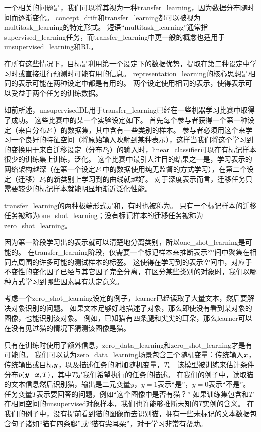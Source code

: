 
一个相关的问题是，我们可以将其视为一种\gls{transfer_learning}，因为数据分布随时间而逐渐变化。
\gls{concept_drift}和\gls{transfer_learning}都可以被视为\gls{multitask_learning}的特定形式。
短语``\gls{multitask_learning}''通常指\gls{supervised_learning}任务，而\gls{transfer_learning}中更一般的概念也适用于\gls{unsupervised_learning}和\gls{RL}。

在所有这些情况下，目标是利用第一个设定下的数据优势，提取在第二种设定中学习时或直接进行预测时可能有用的信息。
\gls{representation_learning}的核心思想是相同的表示可能在两种设定中都是有用的。
两个设定使用相同的表示，使得表示可以受益于两个任务的训练数据。


如前所述，\gls{unsupervised}\gls{DL}用于\gls{transfer_learning}已经在一些机器学习比赛中取得了成功\citep{UTLC+LISA-2011-small,goodfellow+all-NIPS2011}。
这些比赛中的某一个实验设定如下。
首先每个参与者获得一个第一种设定（来自分布$P_1$）的数据集，其中含有一些类别的样本。
参与者必须用这个来学习一个良好的特征空间（将原始输入映射到某种表示），这样当我们将这个学习到的变换用于来自迁移设定（分布$P_2$）的输入时，\gls{linear_classifier}可以在有标记样本很少的训练集上训练，泛化。
这个比赛中最引人注目的结果之一是，学习表示的网络架构越深（在第一个设定$P_1$中的数据使用纯无监督的方式学习），在第二个设定（迁移）$P_2$的新类别上学习到的曲线就越好。
对于深度表示而言，迁移任务只需要较少的标记样本就能明显地渐近泛化性能。


\gls{transfer_learning}的两种极端形式是和，有时也被称为。
只有一个标记样本的迁移任务被称为\gls{one_shot_learning}；没有标记样本的迁移任务被称为\gls{zero_shot_learning}。


因为第一阶段学习出的表示就可以清楚地分离类别，所以\gls{one_shot_learning}\citep{Fei-Fei+al-2006}是可能的。
在\gls{transfer_learning}阶段，仅需要一个标记样本来推断表示空间中聚集在相同点周围的许多可能的测试样本的标签。
这使得在学习到的表示空间中，对应于不变性的变化因子已经与其它因子完全分离，在区分某些类别的对象时，我们以哪种方式学习到哪些因素具有决定意义。


考虑一个\gls{zero_shot_learning}设定的例子，\gls{learner}已经读取了大量文本，然后要解决对象识别的问题。
如果文本足够好地描述了对象，那么即使没有看到某对象的图像，也能识别该对象。
例如，已知猫有四条腿和尖尖的耳朵，那么\gls{learner}可以在没有见过猫的情况下猜测该图像是猫。


只有在训练时使用了额外信息，\gls{zero_data_learning}\citep{Larochelle2008}和\gls{zero_shot_learning}\citep{Palatucci2009,Socher-2013}才是有可能的。
我们可以认为\gls{zero_data_learning}场景包含三个随机变量：传统输入$\boldsymbol{\mathit{x}}$，传统输出或目标$\boldsymbol{\mathit{y}}$，以及描述任务的附加随机变量，$T$。
该模型被训练来估计条件分布$p(\boldsymbol{\mathit{y}} \mid \boldsymbol{\mathit{x}}, T)$，其中$T$是我们希望执行的任务的描述。
在我们的例子中，读取猫的文本信息然后识别猫，输出是二元变量$y$，$y=1$表示``是''，$y=0$表示``不是''。
任务变量$T$表示要回答的问题，例如``这个图像中是否有猫？''
如果训练集包含和$T$在相同空间的\gls{unsupervised}对象样本，我们也许能够推断未知的$T$实例的含义。
在我们的例子中，没有提前看到猫的图像而去识别猫，拥有一些未标记的文本数据包含句子诸如``猫有四条腿''或``猫有尖耳朵''，对于学习非常有帮助。

